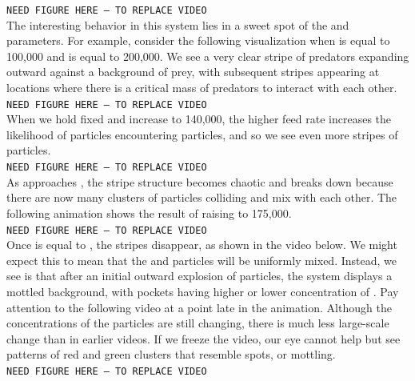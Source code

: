 \texttt{NEED FIGURE HERE -- TO REPLACE VIDEO}\\

The interesting behavior in this system lies in a sweet spot of the  and  parameters. For example, consider the following visualization when  is equal to 100,000 and  is equal to 200,000. We see a very clear stripe of predators expanding outward against a background of prey, with subsequent stripes appearing at locations where there is a critical mass of predators to interact with each other.\\

\texttt{NEED FIGURE HERE -- TO REPLACE VIDEO}\\

When we hold  fixed and increase  to 140,000, the higher feed rate increases the likelihood of  particles encountering  particles, and so we see even more stripes of  particles.\\

\texttt{NEED FIGURE HERE -- TO REPLACE VIDEO}\\

As  approaches , the stripe structure becomes chaotic and breaks down because there are now many clusters of  particles colliding and mix with each other. The following animation shows the result of raising  to 175,000.\\

\texttt{NEED FIGURE HERE -- TO REPLACE VIDEO}\\

Once  is equal to , the stripes disappear, as shown in the video below. We might expect this to mean that the  and  particles will be uniformly mixed. Instead, we see is that after an initial outward explosion of  particles, the system displays a mottled background, with pockets having higher or lower concentration of . Pay attention to the following video at a point late in the animation. Although the concentrations of the particles are still changing, there is much less large-scale change than in earlier videos. If we freeze the video, our eye cannot help but see patterns of red and green clusters that resemble spots, or mottling.\\

\texttt{NEED FIGURE HERE -- TO REPLACE VIDEO}\\

